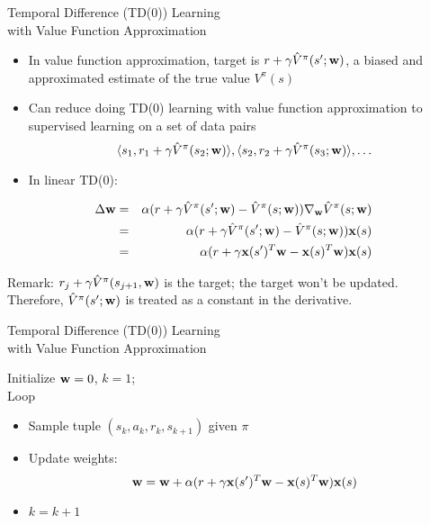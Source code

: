 \documentclass[aspectratio=169]{../latex_main/tntbeamer}  %
\begin{document}
\begin{frame}[c]{Temporal Difference (TD(0)) Learning\\ with Value Function Approximation}
	
	\begin{itemize}
		\item In value function approximation, target is $r + \gamma \hat{V}^\pi (s'; \mathbf{w})$, a biased and approximated estimate of the true value $V^\pi(s)$
		\item Can reduce doing TD(0) learning with value function approximation to supervised learning on a set of data pairs
		$$\langle  s_1, r_1+ \gamma \hat{V}^\pi (s_2; \mathbf{w}) \rangle, \langle  s_2, r_2+ \gamma \hat{V}^\pi (s_3; \mathbf{w}) \rangle, \ldots $$
		\item In linear TD(0):
	\end{itemize}
\vspace{-1em}
\begin{eqnarray}
\Delta \mathbf{w} &=& \alpha( r + \gamma \hat{V}^\pi(s'; \mathbf{w}) - \hat{V}^\pi(s;\mathbf{w})) \nabla_{\mathbf{w}} \hat{V}^\pi (s;\mathbf{w})\nonumber\\
&=& \alpha( r + \gamma \hat{V}^\pi(s'; \mathbf{w}) - \hat{V}^\pi(s;\mathbf{w})) \mathbf{x}(s)\nonumber\\
&=& \alpha( r + \gamma \mathbf{x}(s')^T \mathbf{w} - \mathbf{x}(s)^T\mathbf{w}) \mathbf{x}(s)\nonumber
\end{eqnarray}

\alert{Remark:} $r_j + \gamma \hat{V}^\pi(s_{j+1}, \mathbf{w})$ is the target; the target won't be updated.\\  Therefore, $\hat{V}^\pi(s'; \mathbf{w})$ is treated as a constant in the derivative.
\end{frame}
\begin{frame}[c]{Temporal Difference (TD(0)) Learning\\ with Value Function Approximation}

Initialize $\mathbf{w}= 0$, $k=1$;\\
Loop
	\begin{itemize}
		\item Sample tuple $(s_k, a_k, r_k, s_{k+1})$ given $\pi$
		\item Update weights:
		$$ \mathbf{w} = \mathbf{w} + \alpha( r + \gamma \mathbf{x}(s')^T \mathbf{w} - \mathbf{x}(s)^T\mathbf{w}) \mathbf{x}(s) $$
		\item $k = k + 1$
	\end{itemize}

\end{frame}
\end{document}

